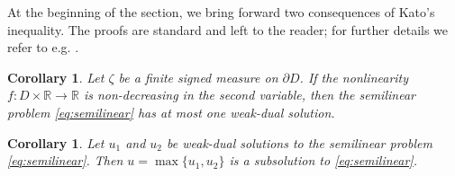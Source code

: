 \documentclass[12pt,a4paper,onecolumn]{article}
\newtheorem{cor}[thm]{Corollary}
\theoremstyle{definition}
\newcommand{\R}{\mathbb{R}}
\newcommand{\1}{\mathbf 1}
\numberwithin{equation}{section}
\begin{document}
At the beginning of the section, we bring forward two consequences of Kato's inequality. The proofs are standard and left to the reader; for further details we refer to e.g. \cite[Proposition 5.8 \& Corollary 5.7]{Bio23cpaa}.
\begin{cor}\label{c:uniq-noninc}
	Let $\zeta$ be a finite signed measure on $\partial D$. If the nonlinearity $f:D\times \R\to \R$ is non-decreasing in the second variable, then the semilinear problem \eqref{eq:semilinear} has at most one weak-dual solution.
\end{cor}

\begin{cor}
	Let $u_1$ and $u_2$ be weak-dual solutions to the semilinear problem \eqref{eq:semilinear}.
	Then $u=\max\{u_1,u_2\}$ is a subsolution to \eqref{eq:semilinear}.
\end{cor}
\end{document}
